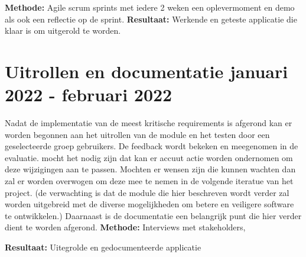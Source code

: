 \textbf{Methode:} Agile scrum sprints met iedere 2 weken een oplevermoment en demo als ook een reflectie op de sprint.
\textbf{Resultaat:} Werkende en geteste applicatie die klaar is om uitgerold te worden.

\section{Uitrollen en documentatie \textbf{januari 2022 - februari 2022 }}\label{sec:uitrollen-en-documentatie}
Nadat de implementatie van de meest kritische requirements is afgerond kan er worden begonnen aan het uitrollen van de module en het testen door een geselecteerde groep gebruikers. De feedback wordt bekeken en meegenomen in de evaluatie. mocht het nodig zijn dat kan er accuut actie worden ondernomen om deze wijzigingen aan te passen. Mochten er wensen zijn die kunnen wachten dan zal er worden overwogen om deze mee te nemen in de volgende iteratue van het project. (de verwachting is dat de module die hier beschreven wordt verder zal worden uitgebreid met de diverse mogelijkheden om betere en veiligere software te ontwikkelen.) Daarnaast is de documentatie een belangrijk punt die hier verder dient te worden afgerond.
\textbf{Methode:} Interviews met stakeholders,

\textbf{Resultaat:} Uitegrolde en gedocumenteerde applicatie
